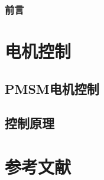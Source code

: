 \documentclass[zihao=-4,linespread=1.5,a4paper,heading=true,twoside]{ctexbook}
\theoremstyle{definition}
\theoremstyle{plain}
\begin{document}
\frontmatter
{}
\section*{前言}\label{sec:preface}


\tableofcontents
\mainmatter
{}

\part{电机控制}\label{sec:I}

\chapter{PMSM电机控制}





\chapter{控制原理}



\newpage\part*{参考文献}
\printbibliography[heading=none]
\end{document}
